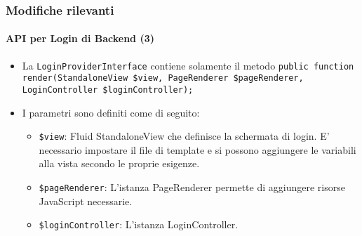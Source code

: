 \begin{frame}[fragile]
	\frametitle{Modifiche rilevanti}
	\framesubtitle{API per Login di Backend (3)}

	\begin{itemize}

		\item La \texttt{LoginProviderInterface} contiene solamente il metodo\newline
			\smaller\texttt{public function render(StandaloneView \$view, PageRenderer \$pageRenderer, LoginController \$loginController);}\normalsize

		\item I parametri sono definiti come di seguito:

			\begin{itemize}

				\item \texttt{\$view}:\newline
					Fluid StandaloneView che definisce la schermata di login. E' necessario impostare
					il file di template e si possono aggiungere le variabili alla vista secondo le 
					proprie esigenze.

				\item \texttt{\$pageRenderer}:\newline
					L'istanza PageRenderer permette di aggiungere risorse JavaScript
					necessarie.

				\item \texttt{\$loginController}:\newline
					L'istanza LoginController.

			\end{itemize}

	\end{itemize}

\end{frame}


